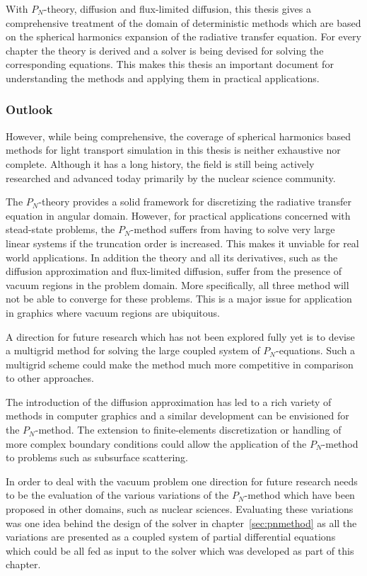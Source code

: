 With $P_N$-theory, diffusion and flux-limited diffusion, this thesis gives a comprehensive treatment of the domain of deterministic methods which are based on the spherical harmonics expansion of the radiative transfer equation. For every chapter the theory is derived and a solver is being devised for solving the corresponding equations. This makes this thesis an important document for understanding the methods and applying them in practical applications.

\subsubsection*{Outlook}

However, while being comprehensive, the coverage of spherical harmonics based methods for light transport simulation in this thesis is neither exhaustive nor complete. Although it has a long history, the field is still being actively researched and advanced today primarily by the nuclear science community.

The $P_N$-theory provides a solid framework for discretizing the radiative transfer equation in angular domain. However, for practical applications concerned with stead-state problems, the $P_N$-method suffers from having to solve very large linear systems if the truncation order is increased. This makes it unviable for real world applications. In addition the theory and all its derivatives, such as the diffusion approximation and flux-limited diffusion, suffer from the presence of vacuum regions in the problem domain. More specifically, all three method will not be able to converge for these problems. This is a major issue for application in graphics where vacuum regions are ubiquitous.

A direction for future research which has not been explored fully yet is to devise a multigrid method for solving the large coupled system of $P_N$-equations. Such a multigrid scheme could make the method much more competitive in comparison to other approaches.

The introduction of the diffusion approximation has led to a rich variety of methods in computer graphics and a similar development can be envisioned for the $P_N$-method. The extension to finite-elements discretization or handling of more complex boundary conditions could allow the application of the $P_N$-method to problems such as subsurface scattering.

In order to deal with the vacuum problem one direction for future research needs to be the evaluation of the various variations of the $P_N$-method which have been proposed in other domains, such as nuclear sciences. Evaluating these variations was one idea behind the design of the solver in chapter~\ref{sec:pnmethod} as all the variations are presented as a coupled system of partial differential equations which could be all fed as input to the solver which was developed as part of this chapter.

